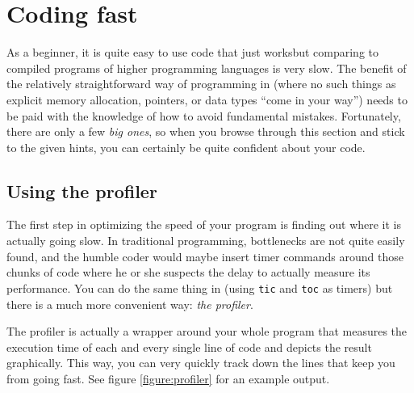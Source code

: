 \newpage
\section{Coding fast}

As a \matlab{} beginner, it is quite easy to use code that just works\texttrademark but comparing to compiled programs of higher programming languages is very slow. The benefit of the relatively straightforward way of programming in \matlab{} (where no such things as explicit memory allocation, pointers, or data types ``come in your way'') needs to be paid with the knowledge of how to avoid fundamental mistakes. Fortunately, there are only a few \emph{big ones}, so when you browse through this section and stick to the given hints, you can certainly be quite confident about your code.

\subsection{Using the profiler}

The first step in optimizing the speed of your program is finding out where it is actually going slow. In traditional programming, bottlenecks are not quite easily found, and the humble coder would maybe insert timer commands around those chunks of code where he or she suspects the delay to actually measure its performance. You can do the same thing in \matlab{} (using \lstinline!tic! and \lstinline!toc! as timers) but there is a much more convenient way: \emph{the profiler}.

The profiler is actually a wrapper around your whole program that measures the execution time of each and every single line of code and depicts the result graphically. This way, you can very quickly track down the lines that keep you from going fast. See figure \ref{figure:profiler} for an example output.

